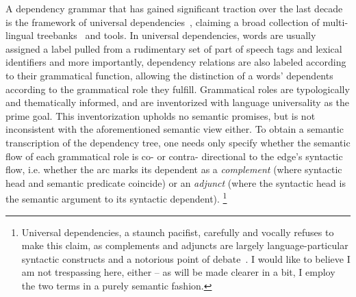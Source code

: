 A dependency grammar that has gained significant traction over the last decade is the framework of universal dependencies~\cite{10.1162/coli_a_00402}, claiming a broad collection of multi-lingual treebanks~\cite{nivre2020universal} and tools.
In universal dependencies, words are usually assigned a label pulled from a rudimentary set of part of speech tags and lexical identifiers and more importantly, dependency relations are also labeled according to their grammatical function, allowing the distinction of a words' dependents according to the grammatical role they fulfill.
Grammatical roles are typologically and thematically informed, and are inventorized with language universality as the prime goal.
This inventorization upholds no semantic promises, but is not inconsistent with the aforementioned semantic view either.
To obtain a semantic transcription of the dependency tree, one needs only specify whether the semantic flow of each grammatical role is co- or contra- directional to the edge's syntactic flow, i.e. whether the arc marks its dependent as a \textit{complement} (where syntactic head and semantic predicate coincide) or an \textit{adjunct} (where the syntactic head is the semantic argument to its syntactic dependent).%
	\footnote{Universal dependencies, a staunch pacifist, carefully and vocally refuses to make this claim, as complements and adjuncts are largely language-particular syntactic constructs and a notorious point of debate~\cite{haspelmath2014arguments}.
	I would like to believe I am not trespassing here, either -- as will be made clearer in a bit, I employ the two terms in a purely semantic fashion.}

